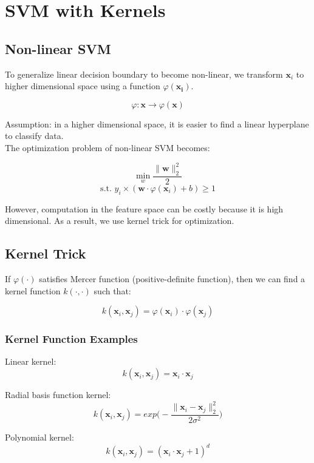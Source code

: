 \chapter{SVM with Kernels}

\begin{multicols*}{2}

\section{Non-linear SVM}

\noindent To generalize linear decision boundary to become non-linear, we transform $\mathbf x_i$ to higher dimensional space using a function $\varphi(\mathbf{x_i})$.

$$\varphi : \mathbf{x} \rightarrow \varphi(\mathbf{x})$$

\noindent Assumption: in a higher dimensional space, it is easier to find a linear hyperplane to classify data. \\

\noindent The optimization problem of non-linear SVM becomes:

$$\!\min_w \frac{\| \mathbf{w} \|_2^2}{2}$$
$$\text{s.t. } y_i \times (\mathbf{w} \cdot \varphi(\mathbf{x}_i) + b) \ge 1$$

\noindent However, computation in the feature space can be costly because it is high dimensional. As a result, we use kernel trick for optimization. 

\section{Kernel Trick}

\noindent If $\varphi(\cdot)$ satisfies Mercer function (positive-definite function), then we can find a kernel function $k(\cdot,\cdot)$ such that:

$$k(\mathbf{x}_i, \mathbf{x}_j) = \varphi(\mathbf{x}_i)\cdot \varphi(\mathbf{x}_j)$$

\subsection{Kernel Function Examples}
\noindent Linear kernel:
$$k(\mathbf{x}_i,\mathbf{x}_j)=\mathbf{x}_i \cdot \mathbf{x}_j$$

\noindent Radial basis function kernel:
$$k(\mathbf{x}_i,\mathbf{x}_j)=exp\Big(-\frac{\|\mathbf{x}_i - \mathbf{x}_j\|_2^2}{2 \sigma^2} \Big)$$

\noindent Polynomial kernel:
$$k(\mathbf{x}_i,\mathbf{x}_j)=(\mathbf{x}_i\cdot \mathbf{x}_j + 1)^d$$


\end{multicols*}
